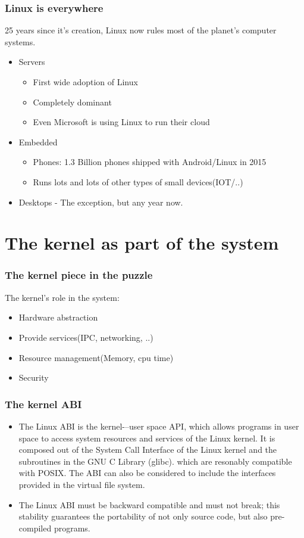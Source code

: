 \documentclass{beamer}
\begin{document}
\begin{frame}
\frametitle{Linux is everywhere}
25 years since it's creation, Linux now rules most of the planet's computer systems. \\
\begin{itemize}
	\item Servers
	\begin{itemize}
		\item First wide adoption of Linux
		\item Completely dominant
		\item Even Microsoft is using Linux to run their cloud
	\end{itemize}
	\item Embedded 
	\begin{itemize}
		\item Phones: 1.3 Billion phones shipped with Android/Linux in 2015
		\item Runs lots and lots of other types of small devices(IOT/..)
	\end{itemize}
	\item Desktops - The exception, but any year now. 
\end{itemize}

\end{frame}

\section{The kernel as part of the system}

\begin{frame}
\frametitle{The kernel piece in the puzzle}
The kernel's role in the system: \\
\begin{itemize}
	\item Hardware abstraction
	\item Provide services(IPC, networking, ..)
	\item Resource management(Memory, cpu time)
	\item Security
\end{itemize}
\end{frame}

\begin{frame}
\frametitle{The kernel ABI}
\begin{itemize}
	\item The Linux ABI is the kernel-–user space API, which allows programs in user space to access system resources and services of the Linux kernel. It is composed out of the System Call Interface of the Linux kernel and the subroutines in the GNU C Library (glibc). which are resonably compatible with POSIX. 
The ABI can also be considered to include the interfaces provided in the virtual file system. 

	\item The Linux ABI must be backward compatible and must not break; this stability guarantees the portability of not only source code, but also pre-compiled programs. 
\end{itemize}
\end{frame}
\end{document}

